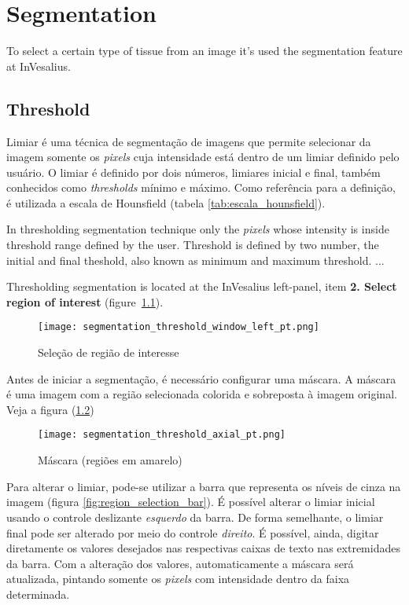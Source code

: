 \chapter{Segmentation}

To select a certain type of tissue from an image it's used the segmentation feature at InVesalius.

\section{Threshold}

Limiar é uma técnica de segmentação de imagens que permite selecionar da imagem somente os \textit{pixels} cuja intensidade está dentro de um limiar definido pelo usuário.  O limiar é definido por dois números, limiares inicial e final, também conhecidos como \textit{thresholds} mínimo e máximo. Como referência para a definição, é utilizada a escala de Hounsfield (tabela \ref{tab:escala_hounsfield}).

In thresholding segmentation technique only the \textit{pixels} whose intensity is inside threshold range defined by the user. Threshold is defined by two number, the initial and final theshold, also known as minimum and maximum threshold. ...

Thresholding segmentation is located at the InVesalius left-panel, item \textbf{2. Select region of interest} (figure~\ref{fig:region_selection}).

\begin{figure}[!htb]
\centering
\texttt{[image: segmentation\_threshold\_window\_left\_pt.png]}
\caption{Seleção de região de interesse}
\label{fig:region_selection}
\end{figure}

Antes de iniciar a segmentação, é necessário configurar uma máscara. A máscara é uma
imagem com a região selecionada colorida e sobreposta à imagem original. Veja a figura
(\ref{fig:region_selection_masc})

\begin{figure}[!htb]
\centering
\texttt{[image: segmentation\_threshold\_axial\_pt.png]}
\caption{Máscara (regiões em amarelo)}
\label{fig:region_selection_masc}
\end{figure}

Para alterar o limiar, pode-se utilizar a barra que representa os níveis de cinza na imagem (figura
\ref{fig:region_selection_bar}). É possível alterar o limiar inicial usando o controle deslizante
\textit{esquerdo} da barra. De forma semelhante, o limiar final pode ser alterado por meio do controle
\textit{direito}. É possível, ainda, digitar diretamente os valores desejados nas respectivas caixas
de texto nas extremidades da barra. Com a alteração dos valores, automaticamente a máscara será atualizada,
pintando somente os \textit{pixels} com intensidade dentro da faixa determinada.

